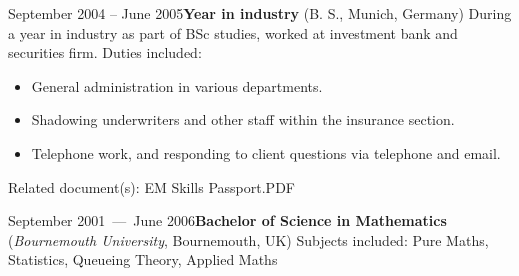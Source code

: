 \documentclass[a4paper, 12pt]{classycv}
\begin{document}
\begin{Resume}
\begin{Entry}[skip above=2em]{September 2004 – June 2005}{\textbf{Year in industry} (B. S., Munich, Germany)}
During a year in industry as part of BSc studies, worked at investment bank and securities firm. Duties included:
\begin{itemize}
	\item General administration in various departments.
	\item Shadowing underwriters and other staff within the insurance section.
	\item Telephone work, and responding to client questions via telephone and email.
\end{itemize}
\hspace*{\fill}\textcolor{accent-background}{Related document(s):} EM Skills Passport.PDF
\end{Entry}
%
%
\newpage%
%
\begin{Entry}[skip above=2em]{September 2001~---~June 2006}{\textbf{Bachelor of Science in Mathematics} (\textit{Bournemouth University}, Bournemouth, UK)}
Subjects included: Pure Maths, Statistics, Queueing Theory, Applied Maths%


\end{Entry}
\end{Resume}
\end{document}
